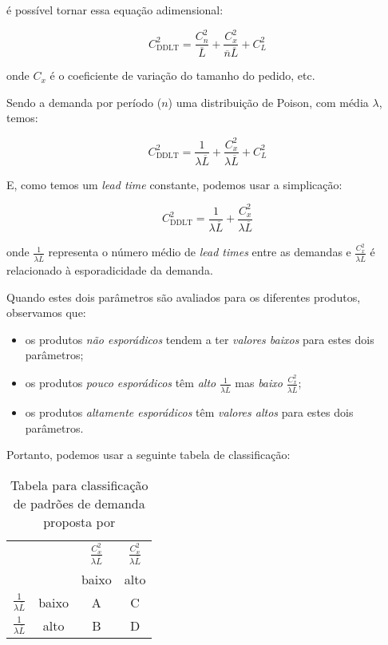 \documentclass{book}
\begin{document}
é possível tornar essa equação adimensional:

\begin{equation}
C_\textrm{DDLT}^2 = \frac{C_n^2}{\overline{L}} + \frac{C_x^2}{\overline{n} \overline{L}} + C_L^2
\end{equation}

onde $C_x$ é o coeficiente de variação do tamanho do pedido, etc. 

Sendo a demanda por período ($n$) uma distribuição de Poison, com média $\lambda$, temos:

\begin{equation}
C_\textrm{DDLT}^2 = \frac{1}{\lambda \overline{L}} + \frac{C_x^2}{\lambda \overline{L}} + C_L^2
\end{equation}

E, como temos um \emph{lead time} constante, podemos usar a simplicação:

\begin{equation}
C_\textrm{DDLT}^2 = \frac{1}{\lambda \overline{L}} + \frac{C_x^2}{\lambda \overline{L}}
\end{equation}

onde $\frac{1}{\lambda \overline{L}}$ representa o número médio de \emph{lead times} entre as demandas e $\frac{C_x^2}{\lambda \overline{L}}$ é relacionado à esporadicidade da demanda.

Quando estes dois parâmetros são avaliados para os diferentes produtos, observamos que:

\begin{itemize}
\item os produtos \emph{não esporádicos} tendem a ter \emph{valores baixos} para estes dois parâmetros;
\item os produtos \emph{pouco esporádicos} têm \emph{alto $\frac{1}{\lambda \overline{L}}$} mas \emph{baixo $\frac{C_x^2}{\lambda \overline{L}}$};
\item os produtos \emph{altamente esporádicos} têm \emph{valores altos} para estes dois parâmetros.
\end{itemize}

Portanto, podemos usar a seguinte tabela de classificação:

\begin{table}[h]
\begin{center}
\begin{tabular}[c]{c c c c }
& & $\frac{C_x^2}{\lambda \overline{L}}$ & $\frac{C_x^2}{\lambda \overline{L}}$ \\
& & baixo & alto \\
$\frac{1}{\lambda \overline{L}}$ & baixo & A & C \\
$\frac{1}{\lambda \overline{L}}$ & alto & B & D \\
\end{tabular}
\caption{Tabela para classificação de padrões de demanda proposta por \cite{Williams1984}}
\label{tab:metodoDeWillians}
\end{center}
\end{table}
\end{document}
